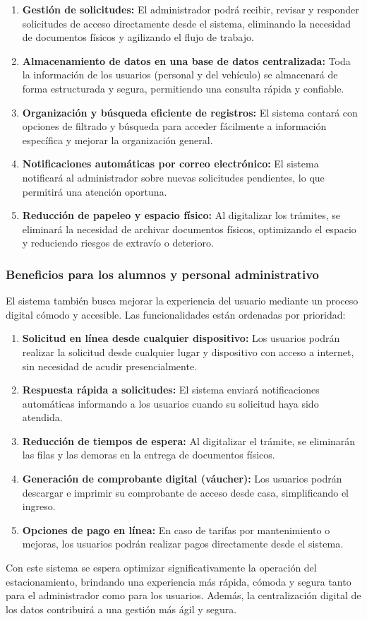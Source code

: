 {\begin{enumerate}
	\item \textbf{Gestión de solicitudes:} El administrador podrá recibir, revisar y responder solicitudes de acceso directamente desde el sistema, eliminando la necesidad de documentos físicos y agilizando el flujo de trabajo.
	\item \textbf{Almacenamiento de datos en una base de datos centralizada:} Toda la información de los usuarios (personal y del vehículo) se almacenará de forma estructurada y segura, permitiendo una consulta rápida y confiable.
	\item \textbf{Organización y búsqueda eficiente de registros:} El sistema contará con opciones de filtrado y búsqueda para acceder fácilmente a información específica y mejorar la organización general.
	\item \textbf{Notificaciones automáticas por correo electrónico:} El sistema notificará al administrador sobre nuevas solicitudes pendientes, lo que permitirá una atención oportuna.
	\item \textbf{Reducción de papeleo y espacio físico:} Al digitalizar los trámites, se eliminará la necesidad de archivar documentos físicos, optimizando el espacio y reduciendo riesgos de extravío o deterioro.
\end{enumerate}

\subsubsection{Beneficios para los alumnos y personal administrativo}

El sistema también busca mejorar la experiencia del usuario mediante un proceso digital cómodo y accesible. Las funcionalidades están ordenadas por prioridad:

\begin{enumerate}
	\item \textbf{Solicitud en línea desde cualquier dispositivo:} Los usuarios podrán realizar la solicitud desde cualquier lugar y dispositivo con acceso a internet, sin necesidad de acudir presencialmente.
	\item \textbf{Respuesta rápida a solicitudes:} El sistema enviará notificaciones automáticas informando a los usuarios cuando su solicitud haya sido atendida.
	\item \textbf{Reducción de tiempos de espera:} Al digitalizar el trámite, se eliminarán las filas y las demoras en la entrega de documentos físicos.
	\item \textbf{Generación de comprobante digital (váucher):} Los usuarios podrán descargar e imprimir su comprobante de acceso desde casa, simplificando el ingreso.
	\item \textbf{Opciones de pago en línea:} En caso de tarifas por mantenimiento o mejoras, los usuarios podrán realizar pagos directamente desde el sistema.
\end{enumerate}

Con este sistema se espera optimizar significativamente la operación del estacionamiento, brindando una experiencia más rápida, cómoda y segura tanto para el administrador como para los usuarios. Además, la centralización digital de los datos contribuirá a una gestión más ágil y segura.




}